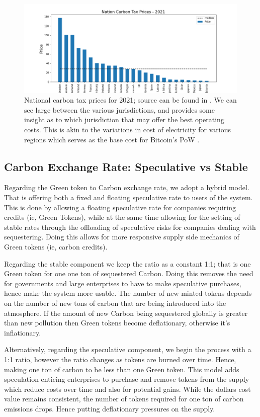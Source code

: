 \documentclass{article}
\begin{document}
\begin{figure}[h]
\centering
\includegraphics[width=5in]{nation_carbon_taxes.png}
\caption{National carbon tax prices for 2021; source can be found in \cite{WBank}. We can see large  between the various jurisdictions, and provides some insight as to which jurisdiction that may offer the best operating costs. This is akin to the variations in cost of electricity for various regions which serves as the base cost for Bitcoin's PoW .} 
\label{figure:nation_carbon_taxes}
\end{figure} 

\subsection{Carbon Exchange Rate: Speculative vs Stable}

Regarding the Green token to Carbon exchange rate, we adopt a hybrid model. That is offering both a fixed and floating speculative rate to users of the system. This is done by allowing a floating speculative rate for companies requiring credits (ie, Green Tokens), while at the same time allowing for the setting of stable rates through the offloading of speculative risks for companies dealing with sequestering. Doing this allows for more responsive supply side mechanics of Green tokens (ie, carbon credits).

Regarding the stable component we keep the ratio as a constant 1:1; that is one Green token for one one ton of sequestered Carbon. Doing this removes the need for governments and large enterprises to have to make speculative purchases, hence make the system more usable. The number of new minted tokens depends on the number of new tons of carbon that are being introduced into the atmosphere. If the amount of new Carbon being sequestered globally is greater than new pollution then Green tokens become deflationary, otherwise it's inflationary.

Alternatively, regarding the speculative component, we begin the process with a 1:1 ratio, however the ratio changes as tokens are burned over time. Hence, making one ton of carbon to be less than one Green token. This model adds speculation enticing enterprises to purchase and remove tokens from the supply which reduce costs over time and also for potential gains. While the dollars cost value remains consistent, the number of tokens required for one ton of carbon emissions drops. Hence putting deflationary pressures on the supply.
\end{document}
